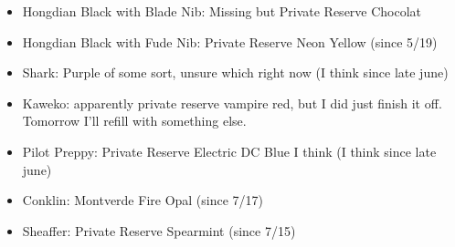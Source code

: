 \documentclass[12pt]{article}
\renewcommand{\,}{\textsuperscript{,}}
\begin{document}
\begin{itemize}

\item Hongdian Black with Blade Nib: Missing but Private Reserve Chocolat  
\item Hongdian Black with Fude Nib: Private Reserve Neon Yellow (since 5/19)  
\item Shark: Purple of some sort, unsure which right now (I think since late june)  
\item Kaweko: apparently private reserve vampire red, but I did just finish it off. Tomorrow I'll refill with something else.  
\item Pilot Preppy: Private Reserve Electric DC Blue I think (I think since late june)  
\item Conklin: Montverde Fire Opal (since 7/17)  
\item Sheaffer: Private Reserve Spearmint (since 7/15)

\end{itemize}
\end{document}
